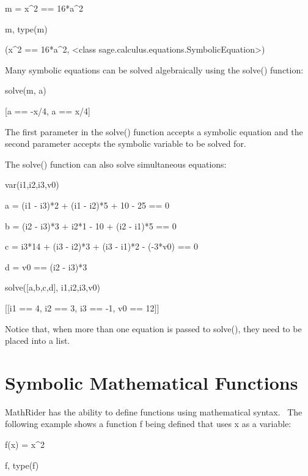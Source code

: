 \documentclass[12pt,twoside]{book}
\begin{document}
\bigskip

m = x\^{}2 == 16*a\^{}2

m, type(m)

{\textbar}

(x\^{}2 == 16*a\^{}2, {\textless}class {\textquotesingle}sage.calculus.equations.SymbolicEquation{\textquotesingle}{\textgreater})

Many symbolic equations can be solved algebraically using the solve() function: 

\bigskip

solve(m, a)

{\textbar}

[a == {}-x/4, a == x/4]

The first parameter in the solve() function accepts a symbolic equation and the second parameter accepts the symbolic variable to be solved for. 

\bigskip

The solve() function can also solve simultaneous equations:


\bigskip

var({\textquotesingle}i1,i2,i3,v0{\textquotesingle})


\bigskip

a = (i1 {}- i3)*2 + (i1 {}- i2)*5 + 10 {}- 25 == 0

b = (i2 {}- i3)*3 + i2*1 {}- 10 + (i2 {}- i1)*5 == 0

c = i3*14 + (i3 {}- i2)*3 + (i3 {}- i1)*2 {}- ({}-3*v0) == 0

d = v0 == (i2 {}- i3)*3


\bigskip

solve([a,b,c,d], i1,i2,i3,v0)

{\textbar}

[[i1 == 4, i2 == 3, i3 == {}-1, v0 == 12]]

Notice that, when more than one equation is passed to solve(), they need to be placed into a list.

\section[Symbolic Mathematical Functions]{ Symbolic Mathematical Functions}

MathRider has the ability to define functions using mathematical syntax. \ The following example shows a function f being defined that uses x as a variable: 

\bigskip

f(x) = x\^{}2

f, type(f)
\end{document}
